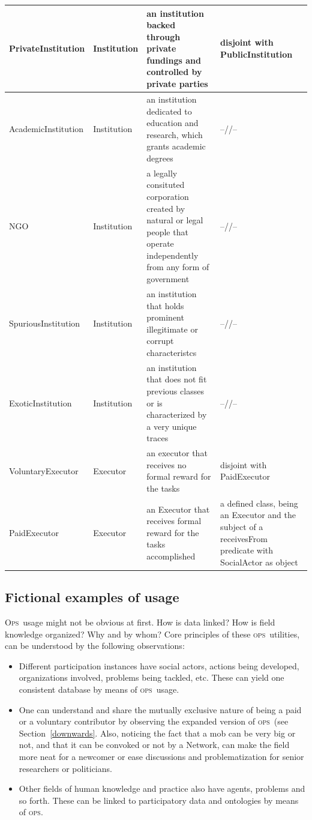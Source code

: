 \documentclass[10pt,letterpaper]{article}
\newcommand{\ops}{\textsc{ops}}
\newcommand{\opsi}{O\textsc{ps}}
\begin{document}
\begin{table}
\begin{adjustwidth}{-2.25in}{0in}
\begin{tabular}{|l|l|p{5cm}|p{5.7cm}|}
PrivateInstitution & Institution & an institution backed through private fundings and controlled by private parties & disjoint with PublicInstitution \\ \hline
AcademicInstitution & Institution & an institution dedicated to education and research, which grants academic degrees & --//-- \\ \hline
NGO & Institution & a legally consituted corporation created by natural or legal people that operate independently from any form of government & --//-- \\\hline
SpuriousInstitution & Institution & an institution that holds prominent illegitimate or corrupt characteristcs & --//-- \\\hline
ExoticInstitution & Institution & an institution that does not fit previous classes or is characterized by a very unique traces & --//-- \\\hline\hline
VoluntaryExecutor & Executor & an executor that receives no formal reward for the tasks & disjoint with PaidExecutor \\ \hline
PaidExecutor & Executor & an Executor that receives formal reward for the tasks accomplished & a defined class, being an Executor and the subject of a receivesFrom predicate with SocialActor as object\\ \hline
  \end{tabular}
  \label{ospFooClass}
\end{adjustwidth}
\end{table}

\subsection{Fictional examples of usage}\label{examplesUsage}

\opsi\ usage might not be obvious at first. How is data linked? How is field knowledge organized? Why and by whom? Core principles of these \ops\ utilities, can be understood by the following observations:
\begin{itemize}
    \item Different participation instances have social actors, actions being developed, organizations involved, problems being tackled, etc. These can yield one consistent database by means of \ops\ usage.
    \item One can understand and share the mutually exclusive nature of being a paid or a voluntary contributor by observing the expanded version of \ops\ (see Section~\ref{downwards}. Also, noticing the fact that a mob can be very big or not, and that it can be convoked or not by a Network, can make the field more neat for a newcomer or ease discussions and problematization for senior researchers or politicians.
    \item Other fields of human knowledge and practice also have agents, problems and so forth. These can be linked to participatory data and ontologies by means of \ops.
\end{itemize}
\end{document}
